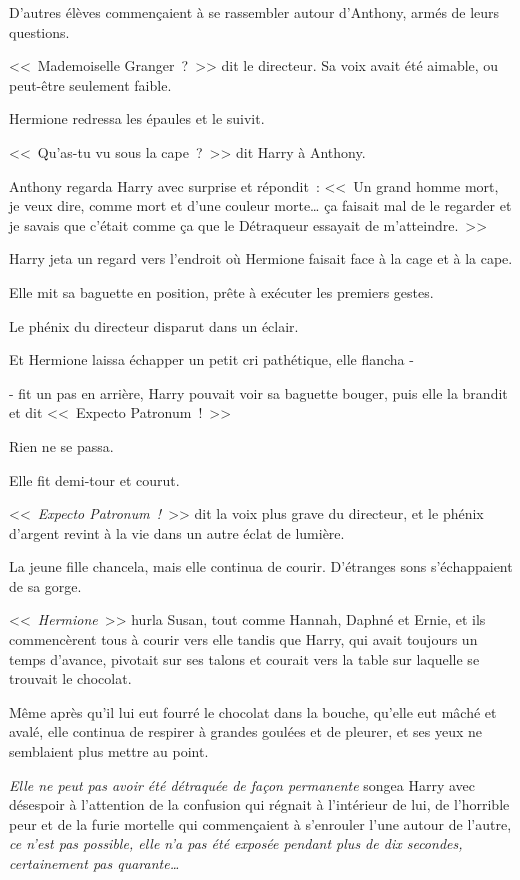 D'autres élèves commençaient à se rassembler autour d'Anthony, armés de leurs questions.

<<~Mademoiselle Granger~?~>> dit le directeur. Sa voix avait été aimable, ou peut-être seulement faible.

Hermione redressa les épaules et le suivit.

<<~Qu'as-tu vu sous la cape~?~>> dit Harry à Anthony.

Anthony regarda Harry avec surprise et répondit~: <<~Un grand homme mort, je veux dire, comme mort et d'une couleur morte… ça faisait mal de le regarder et je savais que c'était comme ça que le Détraqueur essayait de m'atteindre.~>>

Harry jeta un regard vers l'endroit où Hermione faisait face à la cage et à la cape.

Elle mit sa baguette en position, prête à exécuter les premiers gestes.

Le phénix du directeur disparut dans un éclair.

Et Hermione laissa échapper un petit cri pathétique, elle flancha -

- fit un pas en arrière, Harry pouvait voir sa baguette bouger, puis elle la brandit et dit <<~Expecto Patronum~!~>>

Rien ne se passa.

Elle fit demi-tour et courut.

<<~\emph{Expecto Patronum~!}~>> dit la voix plus grave du directeur, et le phénix d'argent revint à la vie dans un autre éclat de lumière.

La jeune fille chancela, mais elle continua de courir. D'étranges sons s'échappaient de sa gorge.

<<~\emph{Hermione}~>> hurla Susan, tout comme Hannah, Daphné et Ernie, et ils commencèrent tous à courir vers elle tandis que Harry, qui avait toujours un temps d'avance, pivotait sur ses talons et courait vers la table sur laquelle se trouvait le chocolat.

Même après qu'il lui eut fourré le chocolat dans la bouche, qu'elle eut mâché et avalé, elle continua de respirer à grandes goulées et de pleurer, et ses yeux ne semblaient plus mettre au point.

\emph{Elle ne peut pas avoir été détraquée de façon permanente} songea Harry avec désespoir à l'attention de la confusion qui régnait à l'intérieur de lui, de l'horrible peur et de la furie mortelle qui commençaient à s'enrouler l'une autour de l'autre, \emph{ce n'est pas possible, elle n'a pas été exposée pendant plus de dix secondes, certainement pas quarante…}

